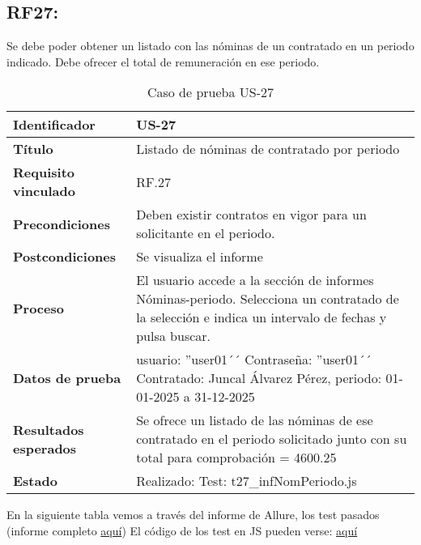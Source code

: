 \subsection{RF27:} Se debe poder obtener un listado con las nóminas de un contratado en un periodo indicado. Debe ofrecer el total de remuneración en ese periodo.
\begin{table}[H]
	\centering
	\renewcommand{\arraystretch}{1.3} 
	\begin{tabularx}{\textwidth}{|l|X|}
		\hline
		\textbf{Identificador} & US-27 \\
		\hline
		\textbf{Título} &Listado de nóminas de contratado por periodo \\
		\hline
		\textbf{Requisito vinculado} & RF.27 \\
		\hline
		\textbf{Precondiciones} & Deben existir contratos en vigor para un solicitante en el periodo.\\
		\hline
		\textbf{Postcondiciones} & Se visualiza el informe \\
		\hline
		\textbf{Proceso} &El usuario accede a la sección de informes Nóminas-periodo. Selecciona un contratado de la selección e indica un intervalo de fechas y pulsa buscar. \\
		\hline
		\textbf{Datos de prueba} & usuario: ''user01´´ Contraseña: ''user01´´ Contratado: Juncal Álvarez Pérez, periodo: 01-01-2025 a 31-12-2025\\
		\hline
		\textbf{Resultados esperados} & Se ofrece un listado de las nóminas de ese contratado en el periodo solicitado junto con su total para comprobación = 4600.25 \\
		\hline
		\textbf{Estado} & Realizado: Test: t27\_infNomPeriodo.js \\
		\hline
	\end{tabularx}
	\caption{Caso de prueba US-27}
	\label{tab:caso_uso27}
\end{table}
En la siguiente tabla vemos a través del informe de Allure, los test pasados (informe completo \href{https://far0010.github.io/TFGUBU-Fran_Arroyo/informe/#} {aquí})
El código de los test en \acrshort{JS} pueden verse: \href{project-docs/memoria/test}{aquí}
